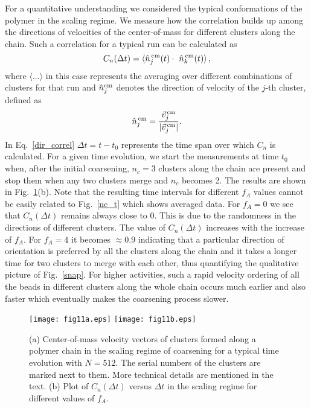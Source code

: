 \documentclass[aps,prx,reprint,showpacs,showkeys,noeprint,longbibliography]{revtex4-1} %
\begin{document}
\par 
For a quantitative understanding we considered the typical conformations of the polymer in the scaling regime. We measure how the correlation builds up among the directions of velocities of the center-of-mass for different clusters along the chain. Such a correlation for a typical run can be calculated as
	\begin{equation}\label{dir_correl}
	C_n(\Delta t)=\langle \hat{n}_j^{\,\rm{cm}}(t) \cdot  ~\hat{n}_k^{\,\rm{cm}}(t) \rangle \,,
	\end{equation}
	where $\langle ... \rangle$ in this case represents the averaging over different combinations of clusters for that run and $\hat{n}_j^{\rm{cm}}$ denotes the direction of velocity of the $j$-th cluster,  defined as 
	\begin{equation}
	 \hat{n}_j^{\,\rm{cm}} = \frac{\vec{v}_j^{\,\rm{cm}}}{|\vec{v}_j^{\,\rm{cm}}|}.	
	\end{equation}
	In Eq.~\eqref{dir_correl} $\Delta t = t - t_0$ represents the time span over which $C_n$ is calculated.
	For a given time evolution, we start the measurements at time $t_0$ when, after the initial coarsening, $n_c = 3$ clusters along the chain are present and stop them when any two clusters merge and $n_c$ becomes 2. The results are shown in Fig.~\ref{com_velo}(b). Note that
	the resulting time intervals for different $f_A$ values cannot be easily related to Fig.~\ref{nc_t} which shows averaged data.
 For $f_A=0$ we see that $C_n(\Delta t)$ remains always close to $0$. This is due to the randomness in the directions of different clusters. The value of $C_n(\Delta t)$ increases with the increase of $f_A$. For $f_A=4$ it becomes $\approx 0.9$ indicating that a particular direction of orientation is preferred by all  the clusters along the chain and it takes a longer time for two clusters to merge with each other, thus quantifying the qualitative picture of Fig.~\ref{snap}.  For higher activities, such a rapid velocity ordering of all the beads in different clusters along the whole chain occurs much earlier and also faster which eventually makes the coarsening process slower.
\begin{figure}[t!]
	\centering
	\texttt{[image: fig11a.eps]}
	\vskip 0.4cm
	\texttt{[image: fig11b.eps]}
	\caption{\label{com_velo}(a) Center-of-mass velocity vectors of clusters formed along a polymer chain in the
			scaling regime of coarsening for a typical time evolution with $N=512$.
		The serial numbers of the clusters are marked next to them. More technical details are mentioned in the text. (b) Plot of $C_n(\Delta t)$ versus $\Delta  t$ in the scaling regime for different values of $f_A$.}
\end{figure}
\end{document}
